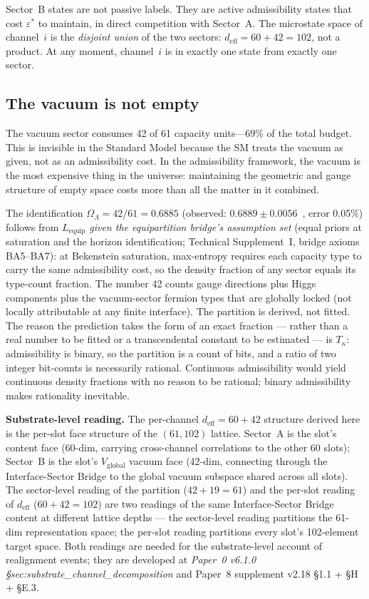 \documentclass[11pt]{article}
\begin{document}
Sector~B states are not passive labels.  They are active admissibility states that cost $\varepsilon^*$ to maintain, in direct competition with Sector~A.  The microstate space of channel~$i$ is the \emph{disjoint union} of the two sectors: $d_{\mathrm{eff}} = 60 + 42 = 102$, not a product.  At any moment, channel~$i$ is in exactly one state from exactly one sector.


\subsection{The vacuum is not empty}

The vacuum sector consumes 42 of 61 capacity units---69\% of the total budget.  This is invisible in the Standard Model because the SM treats the vacuum as given, not as an admissibility cost.  In the admissibility framework, the vacuum is the most expensive thing in the universe: maintaining the geometric and gauge structure of empty space costs more than all the matter in it combined.

The identification $\Omega_\Lambda = 42/61 = 0.6885$ (observed: $0.6889 \pm 0.0056$~\cite{Planck2020}, error 0.05\%) follows from $L_{\mathrm{equip}}$ \emph{given the equipartition bridge's assumption set} (equal priors at saturation and the horizon identification; Technical Supplement~I, bridge axioms BA5--BA7): at Bekenstein saturation, max-entropy requires each capacity type to carry the same admissibility cost, so the density fraction of any sector equals its type-count fraction.  The number 42 counts gauge directions plus Higgs components plus the vacuum-sector fermion types that are globally locked (not locally attributable at any finite interface).  The partition is derived, not fitted.  The reason the prediction takes the form of an exact fraction --- rather than a real number to be fitted or a transcendental constant to be estimated --- is $T_\kappa$: admissibility is binary, so the partition is a count of bits, and a ratio of two integer bit-counts is necessarily rational.  Continuous admissibility would yield continuous density fractions with no reason to be rational; binary admissibility makes rationality inevitable.

\smallskip\noindent\textbf{Substrate-level reading.} The per-channel $d_{\mathrm{eff}} = 60 + 42$ structure derived here is the per-slot face structure of the $(61, 102)$ lattice. Sector~A is the slot's content face (60-dim, carrying cross-channel correlations to the other 60 slots); Sector~B is the slot's $V_{\mathrm{global}}$ vacuum face (42-dim, connecting through the Interface-Sector Bridge to the global vacuum subspace shared across all slots). The sector-level reading of the partition ($42 + 19 = 61$) and the per-slot reading of $d_{\mathrm{eff}}$ ($60 + 42 = 102$) are two readings of the same Interface-Sector Bridge content at different lattice depths --- the sector-level reading partitions the 61-dim representation space; the per-slot reading partitions every slot's 102-element target space. Both readings are needed for the substrate-level account of realignment events; they are developed at \emph{Paper~0 v6.1.0 \S sec:substrate\_channel\_decomposition} and Paper~8 supplement v2.18 \S 1.1 + \S H + \S E.3.
\end{document}

